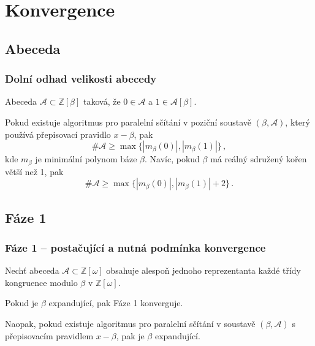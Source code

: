 \documentclass[11pt]{beamer}
\newcommand{\Zomega}{\mathbb{Z}[\omega]}
\newcommand{\Zbeta}{\mathbb{Z}[\beta]}
\newcommand{\A}{\mathcal{A}}
\begin{document}
\begin{frame}
{        \vfill
          }  
\end{frame}

\section{Konvergence}
\subsection{Abeceda}
\begin{frame}
    \frametitle{Dolní odhad velikosti abecedy}
Abeceda $\A\subset \Zbeta$ taková, že $0\in \A$ a $1\in \A[\beta]$.

Pokud existuje algoritmus pro paralelní sčítání v poziční soustavě $(\beta, \A)$, který používá přepisovací pravidlo $x-\beta$, pak
$$
\#\A \geq \max \{|m_\beta(0)|, |m_\beta(1)|\}\,,
$$
kde $m_\beta$ je minimální polynom báze $\beta$.
Navíc, pokud $\beta$ má reálný sdružený kořen větší než 1, pak
$$
\#\A \geq \max \{|m_\beta(0)|, |m_\beta(1)|+2\}\,.
$$
\end{frame}

\subsection{Fáze 1}
\begin{frame}
\frametitle{Fáze 1 -- postačující a nutná podmínka konvergence}
Nechť abeceda $\A\subset\Zomega$ obsahuje alespoň jednoho reprezentanta každé třídy kongruence modulo $\beta$ v $\Zomega$. 

\vspace{1cm}
Pokud je $\beta$ expandující, pak Fáze 1 konverguje.

\vspace{1cm}
Naopak, pokud existuje algoritmus pro paralelní sčítání v soustavě $(\beta,\A)$ s přepisovacím pravidlem $x-\beta$, pak je $\beta$ expandující.


\end{frame}
\end{document}
